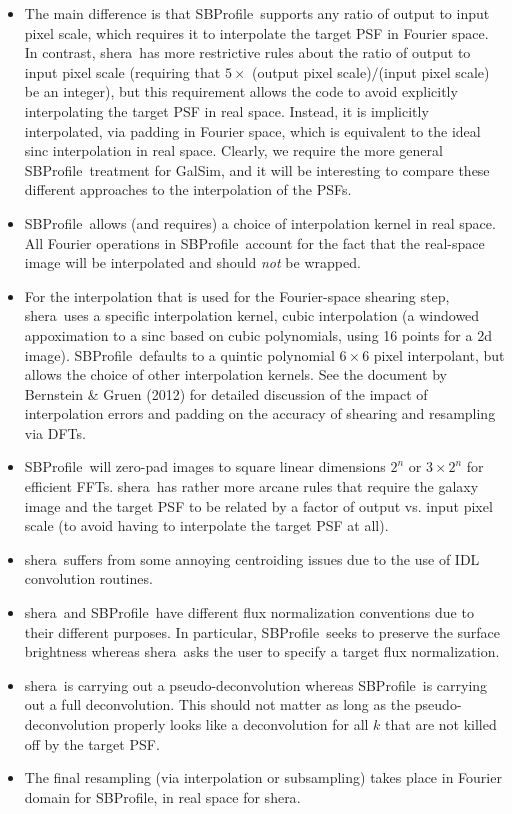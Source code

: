 \documentclass[preprint]{aastex}
\newcommand{\shera}{{\sc shera}}
\newcommand{\sbp}{SBProfile}
\begin{document}
\begin{itemize}
\item The main difference is that \sbp\ supports any ratio of output
  to input pixel scale, which requires it to interpolate the target
  PSF in Fourier space.  In contrast, \shera\ has more restrictive
  rules about the ratio of output to input pixel scale (requiring that
  $5\times$ (output pixel scale)$/$(input pixel scale) be an integer),
  but this requirement allows the code to avoid explicitly
  interpolating the target PSF in real space.  Instead, it is implicitly
  interpolated, via padding in Fourier space, which is equivalent to
  the ideal sinc interpolation in real space.  Clearly, we require the
  more general \sbp\ treatment for GalSim, and it will be interesting
  to compare these different approaches to the 
  interpolation of the PSFs.
\item \sbp\ allows (and requires) a choice of interpolation kernel in real
  space.  All Fourier operations in \sbp\ account for the fact that
  the real-space image will be interpolated and should {\em not} be wrapped.
\item For the interpolation that is used for the Fourier-space
  shearing step, \shera\ uses a specific interpolation kernel, cubic interpolation (a windowed
appoximation to a sinc based on cubic polynomials, using 16 points for
a 2d image). \sbp\ defaults to a quintic polynomial $6\times6$ pixel
interpolant, but allows the choice of other interpolation kernels.
See the document by Bernstein \& Gruen (2012) for detailed discussion
of the impact of interpolation errors and padding on the accuracy of
shearing and resampling via DFTs.
\item \sbp\ will zero-pad
  images to square linear dimensions $2^n$ or $3\times 2^n$ for efficient FFTs.
\shera\ has rather
  more arcane rules that require the galaxy image and the target PSF
  to be related by a factor of output vs. input pixel scale (to avoid
  having to interpolate the target PSF at all).
\item \shera\ suffers from some annoying centroiding issues
  due to the use of IDL convolution routines.
\item \shera\ and \sbp\ have different flux normalization conventions
  due to their different purposes.  In particular, \sbp\ seeks to
  preserve the surface brightness whereas \shera\ asks the user to specify a target
  flux normalization.
\item \shera\ is carrying out a pseudo-deconvolution whereas \sbp\ is
  carrying out a full deconvolution.  This should not matter as long
  as the pseudo-deconvolution properly looks like a deconvolution for
  all $k$ that are not killed off by the target PSF.
\item The final resampling (via interpolation or subsampling) takes
  place in Fourier domain for \sbp, in real space for \shera.
\end{itemize}
\end{document}
